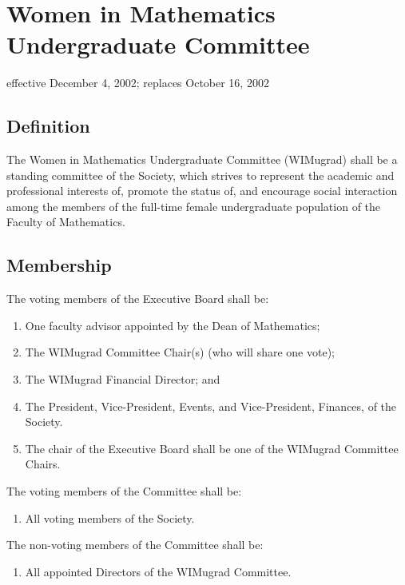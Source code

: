 \section{Women in Mathematics Undergraduate Committee}
effective December 4, 2002; replaces October 16, 2002

\subsection{Definition}
The Women in Mathematics Undergraduate Committee (WIMugrad) shall be a standing committee of the Society, which strives to represent the academic and professional interests of, promote the status of, and encourage social interaction among the members of the full-time female undergraduate population of the Faculty of Mathematics.

\subsection{Membership}
The voting members of the Executive Board shall be:
\begin{enumerate}
\item One faculty advisor appointed by the Dean of Mathematics;
\item The WIMugrad Committee Chair(s) (who will share one vote);
\item The WIMugrad Financial Director; and
\item The President, Vice-President, Events, and Vice-President, Finances, of the Society.
\item The chair of the Executive Board shall be one of the WIMugrad Committee Chairs.
\end{enumerate}
The voting members of the Committee shall be:
\begin{enumerate}
\item All voting members of the Society.
\end{enumerate}
The non-voting members of the Committee shall be:
\begin{enumerate}
\item All appointed Directors of the WIMugrad Committee.
\end{enumerate}


